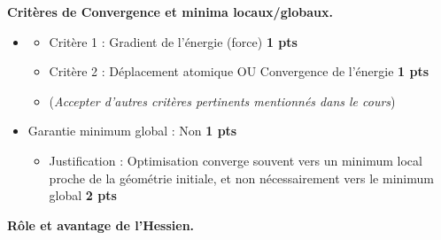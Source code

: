 \documentclass[a4paper,answers]{exam}
\newcommand{\pts}[1]{\textbf{#1 pts}}
\begin{document}
\begin{questions}
\question[5] \textbf{Critères de Convergence et minima locaux/globaux.}

    \begin{solution}
    \begin{itemize}
    \item 
        \begin{itemize}
	        \item Critère 1 : Gradient de l'énergie (force) \hfill  \pts{1}
	        \item Critère 2 : Déplacement atomique OU Convergence de l'énergie \hfill  \pts{1}
	        \item (\textit{Accepter d'autres critères pertinents mentionnés dans le cours})
    	\end{itemize}

        \item Garantie minimum global : Non \hfill  \pts{1}
        \begin{itemize}
            \item Justification : Optimisation converge souvent vers un minimum local proche de la géométrie initiale, et non nécessairement vers le minimum global \hfill  \pts{2}
        \end{itemize}
    \end{itemize}
    \end{solution}

\question[5] \textbf{Rôle et avantage de l'Hessien.}
\end{questions}
\end{document}
